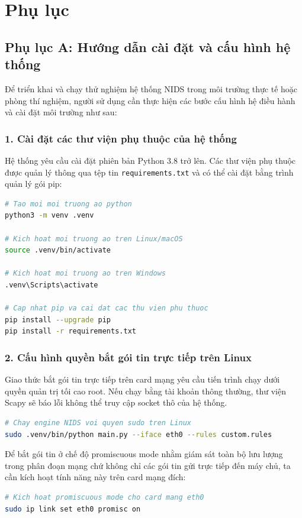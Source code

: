 \clearpage
\chapter*{Phụ lục}

\section*{Phụ lục A: Hướng dẫn cài đặt và cấu hình hệ thống}
Để triển khai và chạy thử nghiệm hệ thống NIDS trong môi trường thực tế hoặc phòng thí nghiệm, người sử dụng cần thực hiện các bước cấu hình hệ điều hành và cài đặt môi trường như sau:

\subsection*{1. Cài đặt các thư viện phụ thuộc của hệ thống}
Hệ thống yêu cầu cài đặt phiên bản Python 3.8 trở lên. Các thư viện phụ thuộc được quản lý thông qua tệp tin \texttt{requirements.txt} và có thể cài đặt bằng trình quản lý gói pip:
\begin{lstlisting}[language=bash]
# Tao moi moi truong ao python
python3 -m venv .venv

# Kich hoat moi truong ao tren Linux/macOS
source .venv/bin/activate

# Kich hoat moi truong ao tren Windows
.venv\Scripts\activate

# Cap nhat pip va cai dat cac thu vien phu thuoc
pip install --upgrade pip
pip install -r requirements.txt
\end{lstlisting}

\subsection*{2. Cấu hình quyền bắt gói tin trực tiếp trên Linux}
Giao thức bắt gói tin trực tiếp trên card mạng yêu cầu tiến trình chạy dưới quyền quản trị tối cao root. Nếu chạy bằng tài khoản thông thường, thư viện Scapy sẽ báo lỗi không thể truy cập socket thô của hệ thống.
\begin{lstlisting}[language=bash]
# Chay engine NIDS voi quyen sudo tren Linux
sudo .venv/bin/python main.py --iface eth0 --rules custom.rules
\end{lstlisting}

Để bắt gói tin ở chế độ promiscuous mode nhằm giám sát toàn bộ lưu lượng trong phân đoạn mạng chứ không chỉ các gói tin gửi trực tiếp đến máy chủ, ta cần kích hoạt tính năng này trên card mạng đích:
\begin{lstlisting}[language=bash]
# Kich hoat promiscuous mode cho card mang eth0
sudo ip link set eth0 promisc on
\end{lstlisting}

